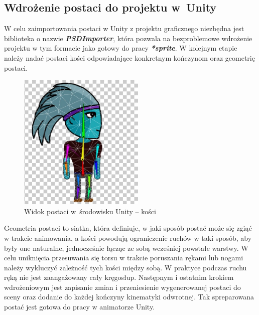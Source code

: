 \documentclass[oneside,polski,logo]{amuthesis}
\begin{document}
\subsection{Wdrożenie postaci do projektu w~Unity}
W celu zaimportowania postaci w Unity z projektu graficznego niezbędna jest biblioteka o nazwie \textbf{\textit{PSDImporter}}, która pozwala na bezproblemowe wdrożenie projektu w tym formacie jako gotowy do pracy \textbf{\textit{*sprite}}. W kolejnym etapie należy nadać postaci kości odpowiadające konkretnym kończynom oraz geometrię postaci.

\begin{figure}[h]
	\centering
	\includegraphics[width=6cm]{images/kozubal/bones.jpg}
	\caption{Widok postaci w~środowisku Unity – kości}
\end{figure}

Geometria postaci to siatka, która definiuje, w jaki sposób postać może się zgiąć w trakcie animowania, a kości powodują ograniczenie ruchów w taki sposób, aby były one naturalne, jednocześnie łącząc ze sobą wcześniej powstałe warstwy. W celu uniknięcia przesuwania się torsu w trakcie poruszania rękami lub nogami należy wykluczyć zależność tych kości między sobą. W praktyce podczas ruchu ręką nie jest zaangażowany cały kręgosłup.
Następnym i ostatnim krokiem wdrożeniowym jest zapisanie zmian i przeniesienie wygenerowanej postaci do sceny oraz dodanie do każdej kończyny kinematyki odwrotnej. Tak spreparowana postać jest gotowa do pracy w animatorze Unity.
\end{document}
